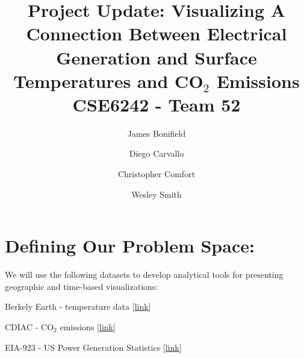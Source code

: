 \documentclass[sigconf,nonacm=true]{acmart}
\newenvironment{my_enumerate}{
	\begin{enumerate}
		\setlength{\itemsep}{0pt}
		\setlength{\parskip}{0pt}
		\setlength{\parsep}{0pt}}
	{\end{enumerate}
}
\begin{document}
%
\title{\color{blue}Project Update:\color{black} Visualizing A Connection Between Electrical Generation and Surface Temperatures and CO$_2$ Emissions \\ CSE6242 - Team 52}

%


\author{James Bonifield}
\affiliation{\institution{}}

\author{Diego Carvallo}
\affiliation{\institution{}}

\author{Christopher Comfort}
\affiliation{\institution{}}

\author{Wesley Smith}
\affiliation{\institution{}}

\maketitle
\section{Defining Our Problem Space:}
We will use the following datasets to develop analytical tools for presenting geographic and time-based visualizations:
\begin{my_enumerate}
	\item Berkely Earth - temperature data \cite{Berkeley_Earth_temp_rohde2013berkeley} [\href{http://berkeleyearth.org/data/}{\color{blue}link}]
	\item CDIAC - CO$_2$ emissions \cite{Foosil_fuel_burning_andres1997geographic}
	 [\href{https://cdiac.ess-dive.lbl.gov/epubs/ndp/ndp058/ndp058_v2016.html}{\color{blue}link}]
	\item EIA-923 - US Power Generation Statistics [\href{https://www.eia.gov/electricity/data/eia923/}{\color{blue}link}]
\end{my_enumerate}
\end{document}
